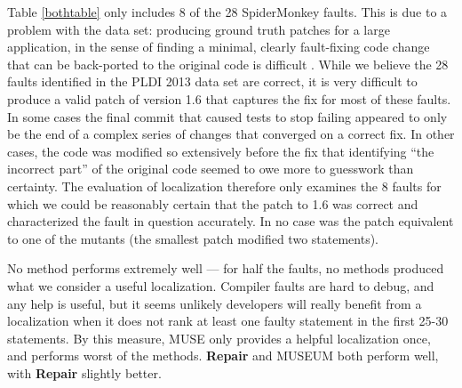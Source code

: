 Table \ref{bothtable} only includes 8 of the 28 SpiderMonkey faults.  This is due to a problem with the data set:  producing ground truth patches for a large application, in the sense of finding a minimal, clearly fault-fixing code change that can be back-ported to the original code is difficult \cite{PLDI13}.  While we believe the 28 faults identified in the PLDI 2013 data set are correct, it is very difficult to produce a valid patch of version 1.6 that captures the fix for most of these faults.  In some cases the final commit that caused tests to stop failing appeared to only be the end of a complex series of changes that converged on a correct fix.  In other cases, the code was modified so extensively before the fix that identifying ``the incorrect part'' of the original code seemed to owe more to guesswork than certainty.  The evaluation of localization therefore only examines the 8 faults for which we could be reasonably certain that the patch to 1.6 was correct and characterized the fault in question accurately.  In no case was the patch equivalent to one of the mutants (the smallest patch modified two statements).

No method performs extremely well --- for half the faults, no methods produced what we consider a useful localization.   Compiler faults are hard to debug, and any help is useful, but it seems unlikely developers will really benefit from a localization when it does not rank at least one faulty statement in the first 25-30 statements.  By this measure, MUSE only provides a helpful localization once, and performs worst of the methods.  {\bf Repair} and MUSEUM both perform well, with {\bf Repair} slightly better.

